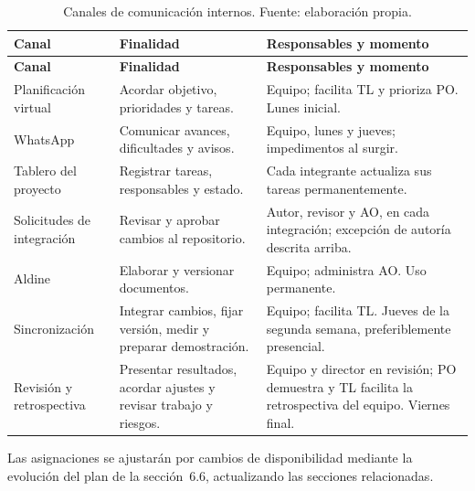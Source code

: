 \begin{longtable}{|p{}|p{}|p{}|}
\caption{Canales de comunicación internos. Fuente: elaboración propia.}\label{tab:canales}\\\hline
\textbf{Canal} & \textbf{Finalidad} & \textbf{Responsables y momento}\tabularnewline\hline
\endfirsthead
\hline
\textbf{Canal} & \textbf{Finalidad} & \textbf{Responsables y momento}\tabularnewline\hline
\endhead
\raggedright Planificación virtual & \raggedright Acordar objetivo, prioridades y tareas. & \raggedright Equipo; facilita TL y prioriza PO. Lunes inicial.\tabularnewline\hline
\raggedright WhatsApp & \raggedright Comunicar avances, dificultades y avisos. & \raggedright Equipo, lunes y jueves; impedimentos al surgir.\tabularnewline\hline
\raggedright Tablero del proyecto & \raggedright Registrar tareas, responsables y estado. & \raggedright Cada integrante actualiza sus tareas permanentemente.\tabularnewline\hline
\raggedright Solicitudes de integración & \raggedright Revisar y aprobar cambios al repositorio. & \raggedright Autor, revisor y AO, en cada integración; excepción de autoría descrita arriba.\tabularnewline\hline
\raggedright Aldine & \raggedright Elaborar y versionar documentos. & \raggedright Equipo; administra AO. Uso permanente.\tabularnewline\hline
\raggedright Sincronización & \raggedright Integrar cambios, fijar versión, medir y preparar demostración. & \raggedright Equipo; facilita TL. Jueves de la segunda semana, preferiblemente presencial.\tabularnewline\hline
\raggedright Revisión y retrospectiva & \raggedright Presentar resultados, acordar ajustes y revisar trabajo y riesgos. & \raggedright Equipo y director en revisión; PO demuestra y TL facilita la retrospectiva del equipo. Viernes final.\tabularnewline\hline
\end{longtable}

Las asignaciones se ajustarán por cambios de disponibilidad mediante la evolución del plan de la sección~6.6, actualizando las secciones relacionadas.
